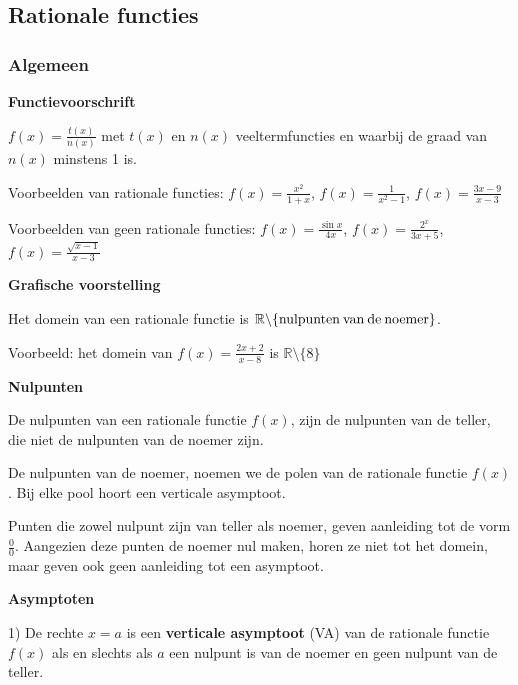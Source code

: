 \subsection{Rationale functies}

\subsubsection{Algemeen}

\textbf{Functievoorschrift}

${\displaystyle f(x)=\frac{t(x)}{n(x)}}$ met $t(x)$ en $n(x)$ veeltermfuncties
en waarbij de graad van $n(x)$ minstens 1 is.

\noindent Voorbeelden van rationale functies: ${\displaystyle f(x)=\frac{x^{2}}{1+x}}$,
${\displaystyle f(x)=\frac{1}{x^{2}-1}}$, ${\displaystyle f(x)=\frac{3x-9}{x-3}}$

\noindent Voorbeelden van geen rationale functies: ${\displaystyle f(x)=\frac{\sin x}{4x}}$,
${\displaystyle f(x)=\frac{2^{x}}{3x+5}}$, ${\displaystyle f(x)=\frac{\sqrt{x-1}}{x-3}}$

\medskip{}


\noindent \textbf{Grafische voorstelling}

Het domein van een rationale functie is $\mathbb{R\setminus}\textrm{\{nulpunten\:van\:de\:noemer\}}$.

Voorbeeld: het domein van ${\displaystyle f(x)=\frac{2x+2}{x-8}}$
is ${\displaystyle \mathbb{R}\setminus\{8\}}$

\medskip{}


\noindent \textbf{Nulpunten}

De nulpunten van een rationale functie $f(x)$, zijn de nulpunten
van de teller, die niet de nulpunten van de noemer zijn.

De nulpunten van de noemer, noemen we de polen van de rationale functie
$f(x)$. Bij elke pool hoort een verticale asymptoot.

\medskip{}


Punten die zowel nulpunt zijn van teller als noemer, geven aanleiding
tot de vorm $\frac{0}{0}$. Aangezien deze punten de noemer nul maken,
horen ze niet tot het domein, maar geven ook geen aanleiding tot een
asymptoot.\medskip{}


\noindent \textbf{Asymptoten}

1) De rechte $x=a$ is een \textbf{verticale asymptoot} (VA) van de
rationale functie $f(x)$ als en slechts als $a$ een nulpunt is van
de noemer en geen nulpunt van de teller.

